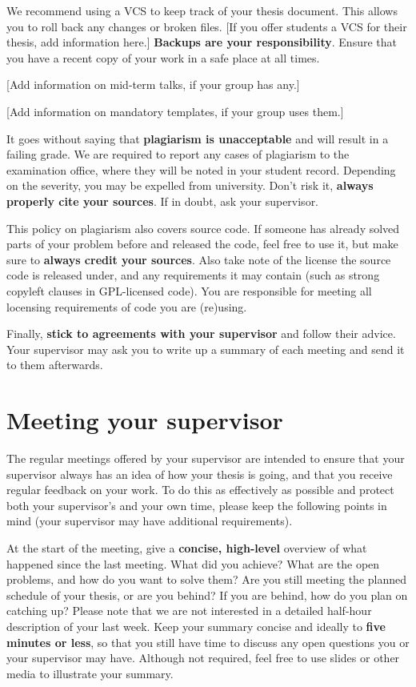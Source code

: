 \documentclass[a4paper, 11pt, hidelinks]{article}
\begin{document}
We recommend using a VCS to keep track of your thesis document.
This allows you to roll back any changes or broken files.
[If you offer students a VCS for their thesis, add information here.]
\textbf{Backups are your responsibility}.
Ensure that you have a recent copy of your work in a safe place at all times.

[Add information on mid-term talks, if your group has any.]

[Add information on mandatory templates, if your group uses them.]

It goes without saying that \textbf{plagiarism is unacceptable} and will result in a failing grade.
We are required to report any cases of plagiarism to the examination office, where they will be noted in your student record.
Depending on the severity, you may be expelled from university.
Don't risk it, \textbf{always properly cite your sources}.
If in doubt, ask your supervisor.

This policy on plagiarism also covers source code.
If someone has already solved parts of your problem before and released the code, feel free to use it, but make sure to \textbf{always credit your sources}.
Also take note of the license the source code is released under, and any requirements it may contain (such as strong copyleft clauses in GPL-licensed code).
You are responsible for meeting all locensing requirements of code you are (re)using.

Finally, \textbf{stick to agreements with your supervisor} and follow their advice.
Your supervisor may ask you to write up a summary of each meeting and send it to them afterwards.

\section*{Meeting your supervisor}
The regular meetings offered by your supervisor are intended to ensure that your supervisor always has an idea of how your thesis is going, and that you receive regular feedback on your work.
To do this as effectively as possible and protect both your supervisor’s and your own time, please keep the following points in mind (your supervisor may have additional requirements).

At the start of the meeting, give a \textbf{concise, high-level} overview of what happened since the last meeting.
What did you achieve?
What are the open problems, and how do you want to solve them?
Are you still meeting the planned schedule of your thesis, or are you behind?
If you are behind, how do you plan on catching up?
Please note that we are not interested in a detailed half-hour description of your last week.
Keep your summary concise and ideally to \textbf{five minutes or less}, so that you still have time to discuss any open questions you or your supervisor may have.
Although not required, feel free to use slides or other media to illustrate your summary.
\end{document}
